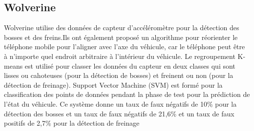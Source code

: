   \subsection{Wolverine}
  Wolverine utilise des données de capteur d'accéléromètre pour la détection des bosses et des freins.Ils ont également proposé un algorithme
 pour réorienter le téléphone mobile pour l'aligner avec l'axe du véhicule, car le téléphone peut être à n'importe quel
  endroit arbitraire à l'intérieur du véhicule. Le regroupement K-means est utilisé pour classer les données du capteur 
  en deux classes qui sont lisses ou cahoteuses (pour la détection de bosses) et freinent ou non (pour la détection de freinage).
   Support Vector Machine (SVM) est formé pour la classification des points de données pendant la phase de test pour la prédiction
    de l'état du véhicule. Ce système donne un taux de faux négatifs de 10\% pour la détection des bosses et un taux de faux
     négatifs de 21,6\% et un taux de faux positifs de 2,7\% pour la détection de freinage







\renewcommand {\thesection}{\thechapter.\arabic{section}}
